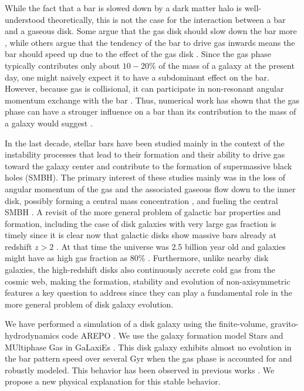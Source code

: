 \documentclass[twocolumn,linenumbers,trackchanges]{aastex631}
\newcommand{\AREPO}{\textsc{AREPO}}
\newcommand{\SMUGGLE}{SMUGGLE}
\begin{document}
While the fact that a bar is slowed down by a dark matter halo is
well-understood theoretically, this is not the case for the interaction between
a bar and a gaseous disk. Some argue that the gas disk should slow down the bar
more \citep{2003MNRAS.341.1179A}, while others argue that the tendency of the
bar to drive gas inwards means the bar should speed up due to the effect of the
gas disk \citep{2013MNRAS.429.1949A, 2014MNRAS.438L..81A}. Since the gas phase
typically contributes only about $10-20\%$ of the mass of a galaxy at the
present day, one might naively expect it to have a subdominant effect on the
bar. However, because gas is collisional, it can participate in non-resonant
angular momentum exchange with the bar \citep{2011MNRAS.415.1027H}. Thus,
numerical work has shown that the gas phase can have a stronger influence on a
bar than its contribution to the mass of a galaxy would suggest
\citep[e.g.,][]{2010ApJ...719.1470V, 2013MNRAS.429.1949A}.


In the last decade, stellar bars have been studied mainly in the context of the
instability processes that lead to their formation and their ability to drive
gas toward the galaxy center and contribute to the formation of supermassive
black holes (SMBH). The primary interest of these studies mainly was in the loss
of angular momentum of the gas and the associated  gaseous flow down to the
inner disk, possibly forming a central mass concentration
\citep{2010ApJ...719.1470V}, and fueling the central SMBH
\citep[e.g.][]{1989Natur.338...45S, 1990Natur.345..679S}. A revisit of the more
general problem of galactic bar properties and formation, including the case of
disk galaxies with very large gas fraction is timely since it is clear now that
galactic disks show massive bars already at redshift $z>2$
\citep{2022arXiv221008658G}. At that time the universe was 2.5 billion year old
and galaxies might have as high gas fraction as 80\% \citep{2020ARAA..58..157T}.
Furthermore, unlike nearby disk galaxies, the high-redshift disks also
continuously accrete cold gas from the cosmic web, making the formation,
stability and evolution of non-axisymmetric features a key question to address
since they can play a fundamental role in the more general problem of disk
galaxy evolution.



We have performed a simulation of a disk galaxy using the finite-volume,
gravito-hydrodynamics code \AREPO{} \citep{2010MNRAS.401..791S}. We use the
galaxy formation model Stars and MUltiphase Gas in GaLaxiEs
\citep[\SMUGGLE{};][]{2019MNRAS.489.4233M}. This disk galaxy exhibits almost no
evolution in the bar pattern speed over several Gyr when the gas phase is
accounted for and robustly modeled. This behavior has been observed in
previous works \citep{1993AA...268...65F, 2007ApJ...666..189B,
2009ApJ...707..218V, 2010ApJ...719.1470V, 2014MNRAS.438L..81A}. We propose a new
physical explanation for this stable behavior.
\end{document}
